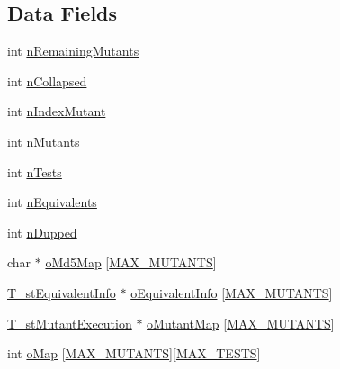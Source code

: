 \subsection*{Data Fields}
\begin{DoxyCompactItemize}
\item 
int \hyperlink{structT__stExecutionMap_ab3356d6f168b030b633e5f25b9a71c28}{n\-Remaining\-Mutants}
\item 
int \hyperlink{structT__stExecutionMap_afa41c6e3578ea7ae351af7b58bd3d023}{n\-Collapsed}
\item 
int \hyperlink{structT__stExecutionMap_ae8e8094bfc7fe1e6952e16866a4ff956}{n\-Index\-Mutant}
\item 
int \hyperlink{structT__stExecutionMap_a881728b28a23929150041bc561994fa6}{n\-Mutants}
\item 
int \hyperlink{structT__stExecutionMap_a8c17b23903f912f51cab70648be4fc75}{n\-Tests}
\item 
int \hyperlink{structT__stExecutionMap_aa165d4228ce93b41cd201d9482aea311}{n\-Equivalents}
\item 
int \hyperlink{structT__stExecutionMap_ad3708a1dc3093d95be783675db030a18}{n\-Dupped}
\item 
char $\ast$ \hyperlink{structT__stExecutionMap_a089e259cc95ab51ae1c134e389e739fb}{o\-Md5\-Map} \mbox{[}\hyperlink{Options_8h_a7b5fa9fc08e6e43e329c804ac562bd00}{M\-A\-X\-\_\-\-M\-U\-T\-A\-N\-T\-S}\mbox{]}
\item 
\hyperlink{structT__stEquivalentInfo}{T\-\_\-st\-Equivalent\-Info} $\ast$ \hyperlink{structT__stExecutionMap_a41d817d987562c2b69eb386534ceccce}{o\-Equivalent\-Info} \mbox{[}\hyperlink{Options_8h_a7b5fa9fc08e6e43e329c804ac562bd00}{M\-A\-X\-\_\-\-M\-U\-T\-A\-N\-T\-S}\mbox{]}
\item 
\hyperlink{structT__stMutantExecution}{T\-\_\-st\-Mutant\-Execution} $\ast$ \hyperlink{structT__stExecutionMap_a7f19bba04bd09de7b2af211dedce7dfd}{o\-Mutant\-Map} \mbox{[}\hyperlink{Options_8h_a7b5fa9fc08e6e43e329c804ac562bd00}{M\-A\-X\-\_\-\-M\-U\-T\-A\-N\-T\-S}\mbox{]}
\item 
int \hyperlink{structT__stExecutionMap_ab2e74b8fc17a93c7956c42b6155d64b1}{o\-Map} \mbox{[}\hyperlink{Options_8h_a7b5fa9fc08e6e43e329c804ac562bd00}{M\-A\-X\-\_\-\-M\-U\-T\-A\-N\-T\-S}\mbox{]}\mbox{[}\hyperlink{Options_8h_a2a77d2f2c5b698c69c19e1f8782bf709}{M\-A\-X\-\_\-\-T\-E\-S\-T\-S}\mbox{]}
\end{DoxyCompactItemize}


